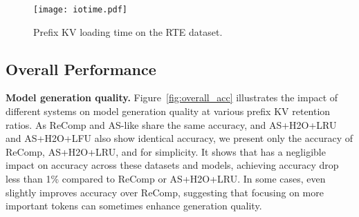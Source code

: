 




\begin{figure}
	\centering
	\texttt{[image: iotime.pdf]}
	 \vspace{-0.1in}
	\caption{Prefix KV loading time on the RTE dataset.}
	\label{fig:iotime}
	\vspace{-0.1in}
\end{figure}



\subsection{Overall Performance}
\label{exp:overall}

\noindent \textbf{Model generation quality.}
Figure~\ref{fig:overall_acc} illustrates the impact of different systems on model generation quality at various prefix KV retention ratios. 
As ReComp and AS-like share the same accuracy, and AS+H2O+LRU and AS+H2O+LFU also show identical accuracy, we present only the accuracy of ReComp, AS+H2O+LRU, and \pname{} for simplicity.
It shows that \pname{} has a negligible impact on accuracy across these datasets
and models, achieving accuracy drop less than 1\% compared to ReComp or AS+H2O+LRU. In
some cases, \pname{} even slightly improves accuracy over ReComp, suggesting
that focusing on more important tokens can sometimes enhance generation quality.




